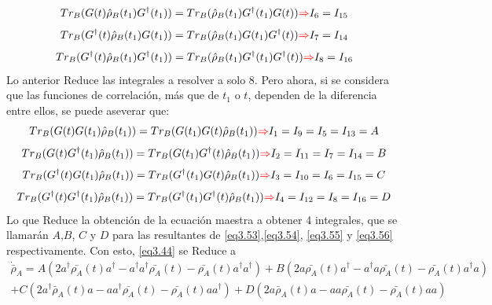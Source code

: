 \documentclass{book}
\begin{document}
\begin{equation}\label{eq3.50} {Tr_B(G(t)\hat{\rho}_B(t_1)G^\dag(t_1))=Tr_B(\hat{\rho}_B(t_1)G^\dag(t_1)G(t)) \textcolor{red}{\Rightarrow} I_{6}=I_{15} }\end{equation}
\begin{equation}\label{eq3.51}{Tr_B(G^\dag(t)\hat{\rho}_B(t_1)G(t_1))=Tr_B(\hat{\rho}_B(t_1)G(t_1)G^\dag(t)) \textcolor{red}{\Rightarrow} I_{7}=I_{14}}\end{equation}
\begin{equation}\label{eq3.52} {Tr_B(G^\dag(t)\hat{\rho}_B(t_1)G^\dag(t_1))=Tr_B(\hat{\rho}_B(t_1)G^\dag(t_1)G^\dag(t)) \textcolor{red}{\Rightarrow} I_{8}=I_{16} }\end{equation}
 Lo anterior Reduce las integrales a resolver a solo 8. Pero ahora, si se considera que las funciones de correlación, más que de $t_1$ o $t$, dependen de la diferencia entre ellos, se puede aseverar que:
 \begin{equation}\label{eq3.53}{Tr_B(G(t)G(t_1)\hat{\rho}_B(t_1))=Tr_B(G(t_1)G(t)\hat{\rho}_B(t_1)) \textcolor{red}{\Rightarrow} I_1=I_9=I_5=I_{13}=A}\end{equation}
 \begin{equation}\label{eq3.54}{Tr_B(G(t)G^\dag(t_1)\hat{\rho}_B(t_1))=Tr_B(G(t_1)G^\dag(t)\hat{\rho}_B(t_1)) \textcolor{red}{\Rightarrow} I_2=I_{11}=I_7=I_{14}=B}\end{equation}
 \begin{equation}\label{eq3.55}{Tr_B(G^\dag(t)G(t_1)\hat{\rho}_B(t_1))=Tr_B(G^\dag(t_1)G(t)\hat{\rho}_B(t_1)) \textcolor{red}{\Rightarrow} I_3=I_{10}=I_6=I_{15}=C}\end{equation}
 \begin{equation}\label{eq3.56}{Tr_B(G^\dag(t)G^\dag(t_1)\hat{\rho}_B(t_1))=Tr_B(G^\dag(t_1)G^\dag(t)\hat{\rho}_B(t_1)) \textcolor{red}{\Rightarrow} I_4=I_{12}=I_8=I_{16}=D}\end{equation}
 Lo que Reduce la obtención de la ecuación maestra a obtener 4 integrales, que se llamarán $A$,$B$, $C$ y $D$ para las resultantes de \textcolor{blue}{\ref{eq3.53}},\textcolor{blue}{\ref{eq3.54}}, \textcolor{blue}{\ref{eq3.55}} y \textcolor{blue}{\ref{eq3.56}} respectivamente.
 Con esto, \textcolor{blue}{\ref{eq3.44}} se Reduce a
 \begin{equation}\label{eq3.57}\begin{aligned}\dot{\bar{\rho}}_A=A(2a^\dag \bar{\rho_A}(t)a^\dag-a^\dag a^\dag\bar{\rho_A}(t)-\bar{\rho_A}(t)a^\dag a^\dag)+B(2a\bar{\rho_A}(t)a^\dag-a^\dag a\bar{\rho_A}(t)-\bar{\rho_A}(t)a^\dag a) \\ +C(2a^\dag \bar{\rho}_A(t)a-aa^\dag\bar{\rho_A}(t)-\bar{\rho_A}(t)a a^\dag)+D(2a \bar{\rho}_A(t)a-a a\bar{\rho_A}(t)-\bar{\rho_A}(t)a a)\end{aligned}\end{equation}
\end{document}
